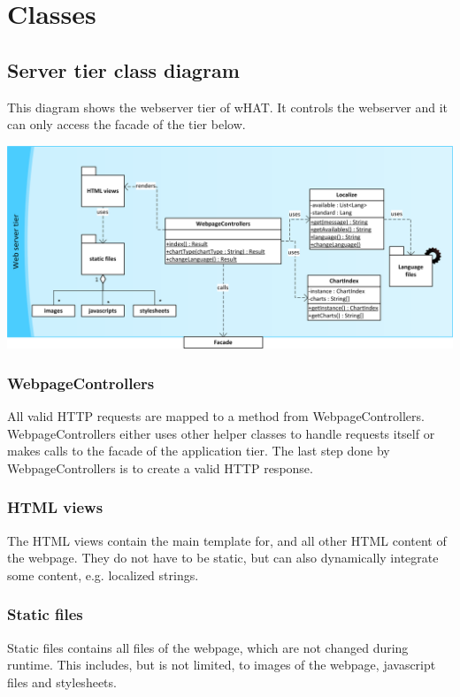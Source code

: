 \section{Classes}



\subsection{Server tier class diagram}
This diagram shows the webserver tier of wHAT. It controls the webserver and it can only access the facade of the tier below.
\begin{center}
\includegraphics[width=1\linewidth]{Pictures/ServerTierDia.png}
\end{center}   


\subsubsection*{WebpageControllers}
All valid HTTP requests are mapped to a method from WebpageControllers.
WebpageControllers either uses other helper classes to handle requests itself  
or makes calls to the facade of the application tier. 
The last step done by WebpageControllers is to create a valid HTTP response.
                                                                            

\subsubsection*{HTML views}
The HTML views contain the main template for, and all other HTML content of the webpage. %
They do not have to be static, but can also dynamically integrate some content, e.g. localized strings.

\subsubsection*{Static files}
Static files contains all files of the webpage, which are not changed during runtime. 
This includes, but is not limited, to images of the webpage, javascript files and stylesheets.

